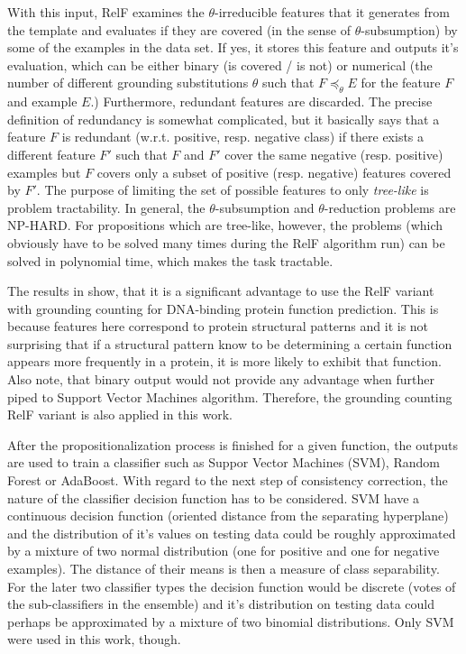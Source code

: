 \documentclass[11pt,twoside,a4paper]{book}
\begin{document}
With this input, RelF examines the $\theta$-irreducible features that it generates from
the template and evaluates if they are covered (in the sense of $\theta$-subsumption)
by some of the examples in the data set.
If yes, it stores this feature and outputs it's evaluation,
which can be either binary (is covered / is not)
or numerical (the number of different grounding substitutions $\theta$ 
such that $F \preceq_{\theta} E$ for the feature $F$ and example $E$.)
Furthermore, redundant features are discarded.
The precise definition of redundancy \cite{relf} is somewhat complicated,
but it basically says that a feature $F$ is redundant (w.r.t. positive, resp. negative class)
if there exists a different feature $F'$ such that $F$ and $F'$ cover
the same negative (resp. positive) examples but $F$ covers only a subset
of positive (resp. negative) features covered by $F'$.
The purpose of limiting the set of possible features to only \emph{tree-like}
is problem tractability.
In general,
the $\theta$-subsumption and $\theta$-reduction problems are NP-HARD.
For propositions which are tree-like, however, the problems 
(which obviously have to be solved many times during the RelF algorithm run)
can be solved in polynomial time, which makes the task tractable.

The results in \cite{szabova} show,
that it is a significant advantage to use the RelF variant with grounding counting
for DNA-binding protein function prediction.
This is because features here correspond to protein structural patterns and
it is not surprising that if a structural pattern know to be determining a certain function
appears more frequently in a protein, it is more likely to exhibit that function.
Also note, that binary output would not provide any advantage when further piped to Support Vector Machines algorithm.
Therefore, the grounding counting RelF variant is also applied in this work. 

After the propositionalization process is finished for a given function,
the outputs are used to train a classifier
such as Suppor Vector Machines (SVM), Random Forest or AdaBoost.
With regard to the next step of consistency correction,
the nature of the classifier decision function has to be considered.
SVM have a continuous decision function
(oriented distance from the separating hyperplane)
and the distribution of it's values on testing data could be 
roughly approximated by a mixture of two normal distribution (one for positive and one for negative examples).
The distance of their means is then a measure of class separability.
For the later two classifier types the decision function
would be discrete (votes of the sub-classifiers in the ensemble)
and it's distribution on testing data could perhaps be approximated by a mixture of two binomial distributions.
Only SVM were used in this work, though.
\end{document}

